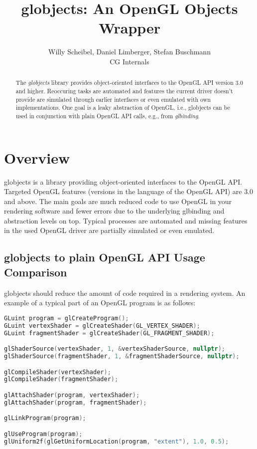 \documentclass{article}
\begin{document}
\title{globjects: An OpenGL Objects Wrapper}
\author{Willy Scheibel, Daniel Limberger, Stefan Buschmann\\CG Internals}

\maketitle

\begin{abstract}
\noindent
The \emph{globjects} library provides object-oriented interfaces to the OpenGL API version 3.0 and higher. Reoccuring tasks are automated and features the current driver doesn't provide are simulated through earlier interfaces or even emulated with own implementations. One goal is a leaky abstraction of OpenGL, i.e., globjects can be used in conjunction with plain OpenGL API calls, e.g., from \emph{glbinding}.

\end{abstract}

\setcounter{tocdepth}{2}
\tableofcontents

\newpage

\section{Overview}

globjects is a library providing object-oriented interfaces to the OpenGL API. Targeted OpenGL features (versions in the language of the OpenGL API) are 3.0 and above.
The main goals are much reduced code to use OpenGL in your rendering software and fewer errors due to the underlying glbinding and abstraction levels on top. Typical processes are automated and missing features in the used OpenGL driver are partially simulated or even emulated.

\subsection{globjects to plain OpenGL API Usage Comparison}

globjects should reduce the amount of code required in a rendering system. An example of a typical part of an OpenGL program is as follows:

\begin{lstlisting}[language=c++,frame=single,basicstyle=\footnotesize]
GLuint program = glCreateProgram();
GLuint vertexShader = glCreateShader(GL_VERTEX_SHADER);
GLuint fragmentShader = glCreateShader(GL_FRAGMENT_SHADER);

glShaderSource(vertexShader, 1, &vertexShaderSource, nullptr);
glShaderSource(fragmentShader, 1, &fragmentShaderSource, nullptr);

glCompileShader(vertexShader);
glCompileShader(fragmentShader);

glAttachShader(program, vertexShader);
glAttachShader(program, fragmentShader);

glLinkProgram(program);

glUseProgram(program);
glUniform2f(glGetUniformLocation(program, "extent"), 1.0, 0.5);
\end{lstlisting}
\end{document}

